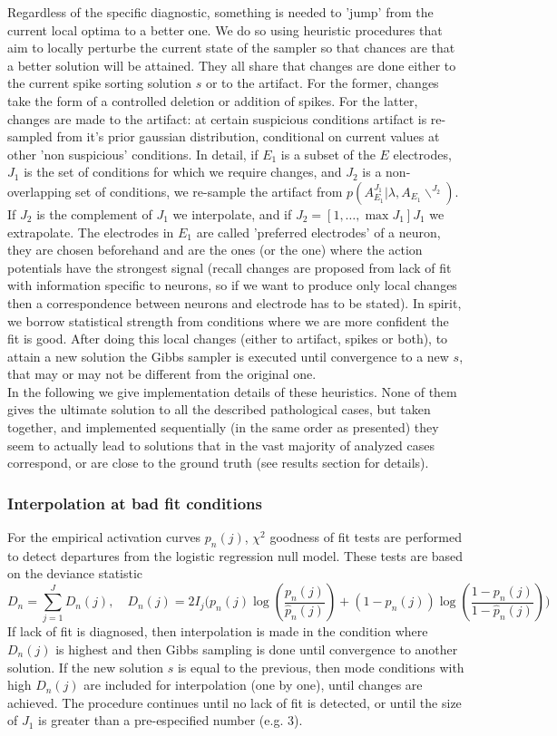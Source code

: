 \documentclass[12pt,letterpaper,fleqn]{article}
\begin{document}
Regardless of the specific diagnostic, something is needed to 'jump' from the current local optima to a better one. We do so using heuristic procedures that aim to locally perturbe the current state of the sampler so that chances are that a better solution will be attained. They all share that changes are done either to the current spike sorting solution $s$ or to the artifact. For the former, changes take the form of a controlled deletion or addition of spikes. For the latter, changes are made to the artifact: at certain suspicious conditions artifact is re-sampled from it's prior gaussian distribution, conditional on current values at other 'non suspicious' conditions. In detail, if $E_1$ is a subset of the $E$ electrodes, $J_1$ is the set of conditions for which we require changes, and $J_2$ is a non-overlapping set of conditions, we re-sample the artifact from $p(A_{E_1}^{J_1}|\lambda,A_{E_1}\backslash^{J_2})$. If $J_2$ is the complement of $J_1$ we interpolate, and if $J_2=[1,\ldots,\max{J_1}] J_1$ we extrapolate. The electrodes in $E_1$  are called 'preferred electrodes' of a neuron, they are chosen beforehand and are the ones (or the one) where the action potentials have the strongest signal (recall changes are proposed from lack of fit with information specific to neurons, so if we want to produce only local changes then a correspondence between neurons and electrode has to be stated). In spirit, we borrow statistical strength from conditions where we are more confident the fit is good. After doing this local changes (either to artifact, spikes or both), to attain a new solution the Gibbs sampler is executed until convergence to a new $s$, that may or may not be different from the original one.\\

In the following we give implementation details of these heuristics. None of them gives the ultimate solution to all the described pathological cases, but taken together, and implemented sequentially (in the same order as presented) they seem to actually lead to solutions that in the vast majority of analyzed cases correspond, or are close to the ground truth (see results section for details).

\subsubsection{Interpolation at bad fit conditions}
For the empirical activation curves $p_n(j)$, $\chi^2$ goodness of fit tests  \cite{HosmerEtal97}  are performed to detect departures from the logistic regression null model. These tests are based on the deviance statistic
$$D_n=\sum_{j=1}^J D_n(j),\quad D_n(j)=2 I_j \Big( p_n(j)\log\left(\frac{p_n(j)}{\hat{p}_n(j)}\right)+(1-p_n(j))\log\left(\frac{1-p_n(j)}{1-\hat{p}_n(j)}\right)\Big)$$
If lack of fit is diagnosed, then interpolation is made in the condition where $D_n(j)$ is highest and then Gibbs sampling is done until convergence to another solution. If the new solution $s$ is equal to the previous, then mode conditions with high $D_n(j)$ are included for interpolation (one by one), until changes are achieved. The procedure continues until no lack of fit is detected, or until the size of $J_1$ is greater than a pre-especified number (e.g. 3).
\end{document}
